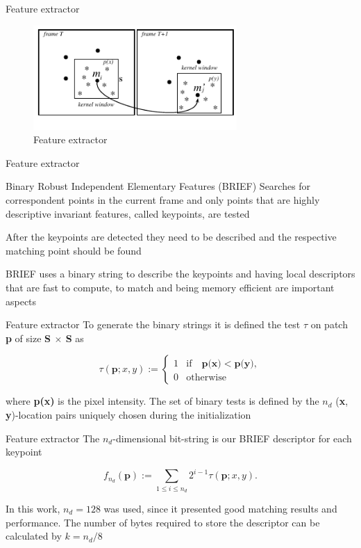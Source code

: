\documentclass{beamer}
\begin{document}
\begin{frame}{Feature extractor}
  \begin{figure}[!htb]
    \centering
    \includegraphics[width=220pt]{../chapters/tracking_library_for_the_web/BRIEF.pdf}
    \caption{Feature extractor}
    \label{figure:BRIEF}
  \end{figure}
\end{frame}
\begin{frame}{Feature extractor}
  \begin{block}{Binary Robust Independent Elementary Features (BRIEF)}
      Searches for correspondent points in the current frame and only points that are highly descriptive invariant features, called keypoints, are tested
  \end{block}
  \begin{block}{}
      After the keypoints are detected they need to be described and the respective matching point should be found
  \end{block}
  \begin{block}{}
      BRIEF uses a binary string to describe the keypoints and having local descriptors that are fast to compute, to match and being memory efficient are important aspects
  \end{block}
\end{frame}
\begin{frame}{Feature extractor}
  To generate the binary strings it is defined the test $\tau$ on patch \textbf{p} of size \textbf{S $\times$ S} as

  $$\tau(\textbf{p}; x, y) :=
  \begin{cases}
    1 &\mbox{if}\quad \textbf{p(x)} < \textbf{p(y)},\\
    0 &\mbox{otherwise}
  \end{cases}$$

  where \textbf{p(x)} is the pixel intensity. The set of binary tests is defined by the $n_{d}$ (\textbf{x}, \textbf{y})-location pairs uniquely chosen during the initialization
\end{frame}
\begin{frame}{Feature extractor}
  The $n_{d}$-dimensional bit-string is our BRIEF descriptor for each keypoint

  $$f_{n_{d}}(\textbf{p}) := \sum_{1 \le i \le n_{d}} 2^{i-1} \tau(\textbf{p}; x, y).$$

  In this work, $n_{d}= 128$ was used, since it presented good matching results and performance. The number of bytes required to store the descriptor can be calculated by $k = n_{d}/8$
\end{frame}
\end{document}
